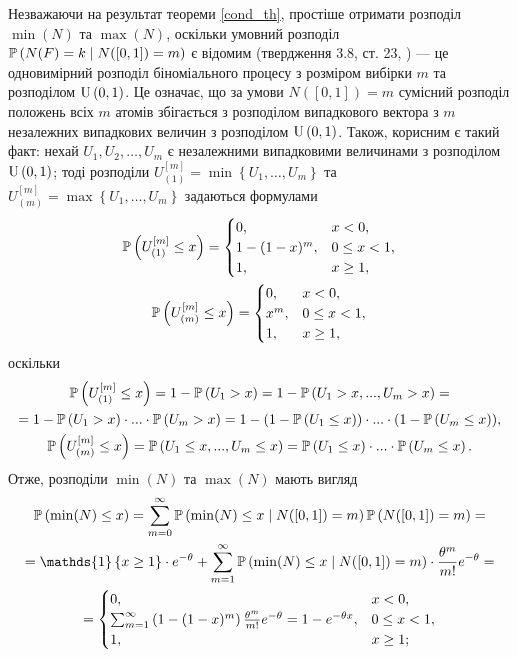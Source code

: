 Незважаючи на результат теореми \ref{cond_th}, простіше отримати розподіл
 $\min(N)$ та $\max(N)$, %
оскільки умовний розподіл $\P{N(F) = k \mid N([0, 1]) = m}$ 
є відомим (твердження 3.8, ст. 23, \cite{last_penrose_2017}) --- це
одновимірний розподіл
біноміального процесу з розміром вибірки $m$ та розподілом $\Unif{0, 1}$.
Це означає, що за умови $N([0, 1]) = m$
сумісний розподіл положень всіх $m$ атомів збігається з 
розподілом випадкового вектора 
з $m$ незалежних 
випадкових величин з розподілом $\Unif{0, 1}$.
Також, корисним є такий факт: нехай $U_1, U_2, \dots, U_m$ є
незалежними випадковими величинами з розподілом $\Unif{0, 1}$;
тоді розподіли $U_{(1)}^{[m]} = \min\left\{U_1, \dots, U_m\right\}$ 
та $U_{(m)}^{[m]} = \max\left\{U_1, \dots, U_m\right\}$ задаються
формулами
\begin{gather*}
    \P{U_{(1)}^{[m]} \leq x} = \begin{cases}
        0, & x < 0, \\
        1 - (1 - x)^m, & 0 \leq x < 1, \\
        1, & x \geq 1,
    \end{cases} \\
    \P{U_{(m)}^{[m]} \leq x} = \begin{cases}
        0, & x < 0, \\
        x^m, & 0 \leq x < 1, \\
        1, & x \geq 1,
    \end{cases}
\end{gather*}
оскільки
\begin{gather*}
    \P{U_{(1)}^{[m]} \leq x} = 1 - \P{U_{{1}} > x} = 1 - \P{U_1 > x, ..., U_m > x} = 
    \\ = 1 - \P{U_1 > x} \cdot ... \cdot \P{U_m > x} = 
    1 - (1 - \P{U_1 \leq x}) \cdot ... \cdot (1 - \P{U_m \leq x}), \\
    \P{U_{(m)}^{[m]} \leq x} = \P{U_1 \leq x, ..., U_m \leq x} = 
    \P{U_1 \leq x} \cdot ... \cdot \P{U_m \leq x}.
\end{gather*}
Отже, розподіли $\min(N)$ та $\max(N)$ мають вигляд
\begin{gather}
    \P{\min(N) \leq x} = \sum_{m=0}^{\infty} \P{\min(N) \leq x \mid N([0, 1]) = m} \P{N([0, 1]) = m} = \\ \nonumber
     = \mathds{1}\left\{x\geq 1\right\}\cdot e^{-\theta} +
    \sum_{m=1}^{\infty} \P{\min(N) \leq x \mid N([0, 1]) = m} \cdot \frac{\theta^m}{m!} e^{-\theta} = \\ \nonumber
    = \begin{cases}
        0, & x < 0, \\
        \sum_{m=1}^{\infty} \left(1 - (1 - x)^m\right) \frac{\theta^m}{m!} e^{-\theta} = 1 - e^{-\theta x}, & 0 \leq x < 1, \\
        1, & x \geq 1;
    \end{cases}
\end{gather}
